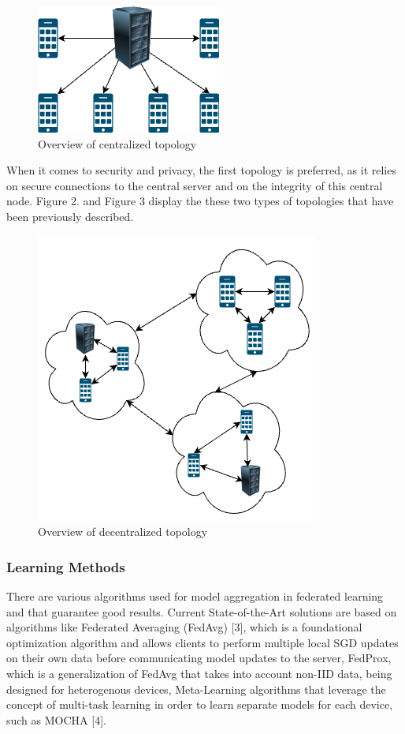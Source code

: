 \documentclass[conference]{IEEEtran}
\begin{document}
\begin{figure}[htbp]
\centerline{\includegraphics[scale=0.7]{centralized_training.png}}
\caption{Overview of centralized topology}
\label{fig}
\end{figure}

When it comes to security and privacy, the first topology is preferred, as it relies on secure connections to the central server and on the integrity of this central node. Figure 2. and Figure 3 display the these two types of topologies that have been previously described.

\begin{figure}[htbp]
\centerline{\includegraphics[scale=0.5]{decentralized_training.png}}
\caption{Overview of decentralized topology}
\label{fig}
\end{figure}

\subsubsection{Learning Methods}

There are various algorithms used for model aggregation in federated learning and that guarantee good results. Current State-of-the-Art solutions are based on algorithms like Federated Averaging (FedAvg) [3], which is a foundational optimization algorithm and allows clients to perform multiple local SGD updates on their own data before communicating model updates to the server, FedProx, which is a generalization of FedAvg that takes into account non-IID data, being designed for heterogenous devices, Meta-Learning algorithms that leverage the concept of multi-task learning in order to learn separate models for each device, such as MOCHA [4].
\end{document}

